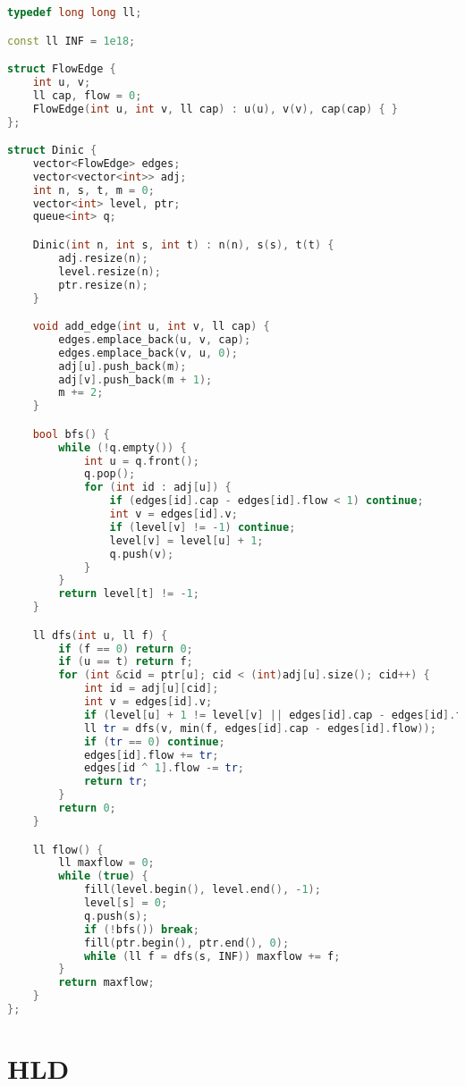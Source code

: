 \documentclass[10pt, a4paper, oneside]{book}
\begin{document}
\begin{lstlisting}[language=C++]
typedef long long ll;

const ll INF = 1e18;

struct FlowEdge {
    int u, v;
    ll cap, flow = 0;
    FlowEdge(int u, int v, ll cap) : u(u), v(v), cap(cap) { }
};

struct Dinic {
    vector<FlowEdge> edges;
    vector<vector<int>> adj;
    int n, s, t, m = 0;
    vector<int> level, ptr;
    queue<int> q;

    Dinic(int n, int s, int t) : n(n), s(s), t(t) {
        adj.resize(n);
        level.resize(n);
        ptr.resize(n);
    }

    void add_edge(int u, int v, ll cap) {
        edges.emplace_back(u, v, cap);
        edges.emplace_back(v, u, 0);
        adj[u].push_back(m);
        adj[v].push_back(m + 1);
        m += 2;
    }

    bool bfs() {
        while (!q.empty()) {
            int u = q.front();
            q.pop();
            for (int id : adj[u]) {
                if (edges[id].cap - edges[id].flow < 1) continue;
                int v = edges[id].v;
                if (level[v] != -1) continue;
                level[v] = level[u] + 1;
                q.push(v);
            }
        }
        return level[t] != -1;
    }

    ll dfs(int u, ll f) {
        if (f == 0) return 0;
        if (u == t) return f;
        for (int &cid = ptr[u]; cid < (int)adj[u].size(); cid++) {
            int id = adj[u][cid];
            int v = edges[id].v;
            if (level[u] + 1 != level[v] || edges[id].cap - edges[id].flow < 1) continue;
            ll tr = dfs(v, min(f, edges[id].cap - edges[id].flow));
            if (tr == 0) continue;
            edges[id].flow += tr;
            edges[id ^ 1].flow -= tr;
            return tr;
        }
        return 0;
    }

    ll flow() {
        ll maxflow = 0;
        while (true) {
            fill(level.begin(), level.end(), -1);
            level[s] = 0;
            q.push(s);
            if (!bfs()) break;
            fill(ptr.begin(), ptr.end(), 0);
            while (ll f = dfs(s, INF)) maxflow += f;
        }
        return maxflow;
    }
};
\end{lstlisting}
\hfill

\section{HLD}
\end{document}

